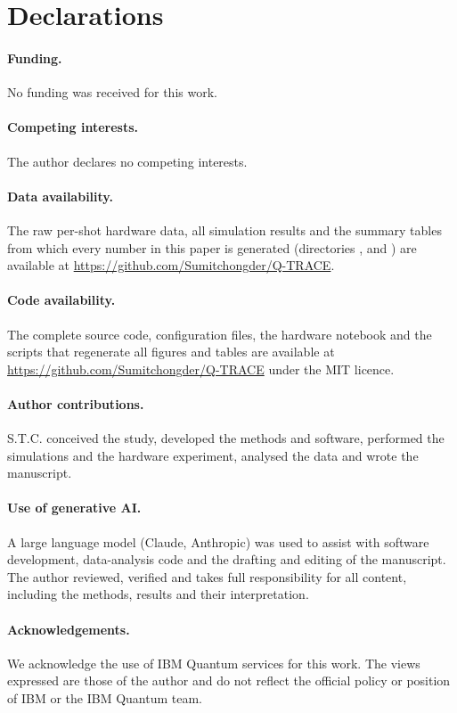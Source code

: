 \section*{Declarations}

\paragraph{Funding.} No funding was received for this work.

\paragraph{Competing interests.} The author declares no competing interests.

\paragraph{Data availability.} The raw per-shot hardware data, all simulation results and the summary tables from which every number in this paper is generated (directories ,  and ) are available at \url{https://github.com/Sumitchongder/Q-TRACE}.

\paragraph{Code availability.} The complete source code, configuration files, the hardware notebook and the scripts that regenerate all figures and tables are available at \url{https://github.com/Sumitchongder/Q-TRACE} under the MIT licence.

\paragraph{Author contributions.} S.T.C. conceived the study, developed the methods and software, performed the simulations and the hardware experiment, analysed the data and wrote the manuscript.

\paragraph{Use of generative AI.} A large language model (Claude, Anthropic) was used to assist with software development, data-analysis code and the drafting and editing of the manuscript. The author reviewed, verified and takes full responsibility for all content, including the methods, results and their interpretation.

\paragraph{Acknowledgements.} We acknowledge the use of IBM Quantum services for this work. The views expressed are those of the author and do not reflect the official policy or position of IBM or the IBM Quantum team.
